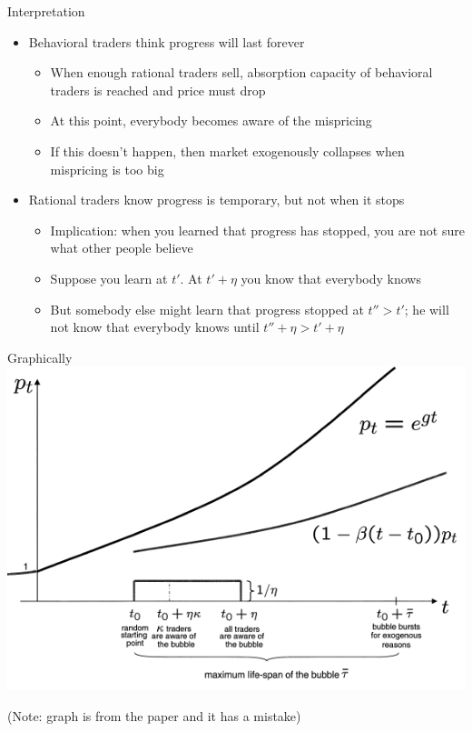 \documentclass[english,10pt
,aspectratio=169
]{beamer}
\begin{document}
\begin{frame}{Interpretation}
	\begin{itemize}
		\item Behavioral traders think progress will last forever
		\begin{itemize}
			\item When enough rational traders sell, absorption capacity of behavioral traders is reached and  price must drop
			\item At this point, everybody becomes aware of the mispricing
			\item If this doesn't happen, then market exogenously collapses when mispricing is too big
		\end{itemize}
		\item Rational traders know progress is temporary, but not when it stops
		\begin{itemize}
			\item Implication: when you learned that progress has stopped, you are not sure what other people believe
			\item Suppose you learn at $t'$. At $t' + \eta$ you know that everybody knows
			\item But somebody else might learn that progress stopped at $t''>t'$; he will not know that everybody knows until $t''+\eta>t'+\eta$
		\end{itemize}
	\end{itemize}
\end{frame}


\begin{frame}{Graphically}
	\center
	\includegraphics[width=0.57 \paperwidth]{pics/AbreuBrun}
	
	(Note: graph is from the paper and it has a mistake)
\end{frame}
\end{document}
